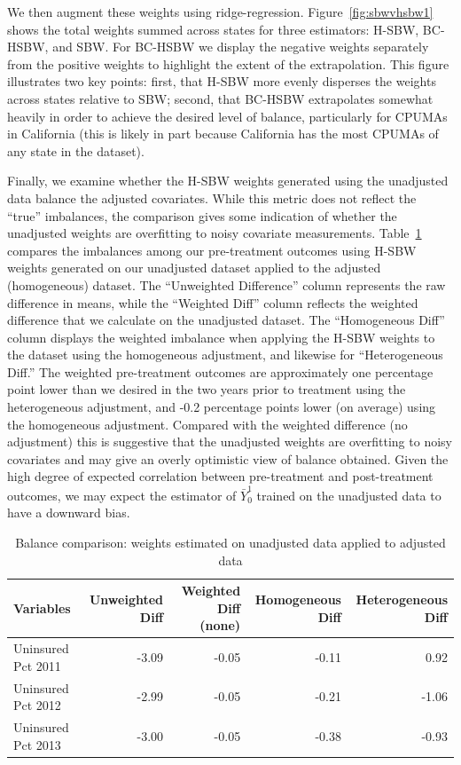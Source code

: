 \documentclass[aoas]{imsart}
\theoremstyle{plain}
\theoremstyle{remark}
\begin{document}
We then augment these weights using ridge-regression. Figure~\ref{fig:sbwvhsbw1} shows the total weights summed across states for three estimators: H-SBW, BC-HSBW, and SBW. For BC-HSBW we display the negative weights separately from the positive weights to highlight the extent of the extrapolation. This figure illustrates two key points: first, that H-SBW more evenly disperses the weights across states relative to SBW; second, that BC-HSBW extrapolates somewhat heavily in order to achieve the desired level of balance, particularly for CPUMAs in California (this is likely in part because California has the most CPUMAs of any state in the dataset).

Finally, we examine whether the H-SBW weights generated using the unadjusted data balance the adjusted covariates. While this metric does not reflect the ``true'' imbalances, the comparison gives some indication of whether the unadjusted weights are overfitting to noisy covariate measurements. Table~\ref{tab:balcomp} compares the imbalances among our pre-treatment outcomes using H-SBW weights generated on our unadjusted dataset applied to the adjusted (homogeneous) dataset. The ``Unweighted Difference'' column represents the raw difference in means, while the ``Weighted Diff'' column reflects the weighted difference that we calculate on the unadjusted dataset. The ``Homogeneous Diff'' column displays the weighted imbalance when applying the H-SBW weights to the dataset using the homogeneous adjustment, and likewise for ``Heterogeneous Diff.'' The weighted pre-treatment outcomes are approximately one percentage point lower than we desired in the two years prior to treatment using the heterogeneous adjustment, and -0.2 percentage points lower (on average) using the homogeneous adjustment. Compared with the weighted difference (no adjustment) this is suggestive that the unadjusted weights are overfitting to noisy covariates and may give an overly optimistic view of balance obtained. Given the high degree of expected correlation between pre-treatment and post-treatment outcomes, we may expect the estimator of $\bar{Y}^1_0$ trained on the unadjusted data to have a downward bias.

\begin{table}[ht]
\caption{Balance comparison: weights estimated on unadjusted data applied to adjusted data}\label{tab:balcomp}
\begin{tabular}{lrrrr}
  \hline
Variables & Unweighted Diff & Weighted Diff (none) & Homogeneous Diff & Heterogeneous Diff\\ 
  \hline
Uninsured Pct 2011 & -3.09 & -0.05 & -0.11 & 0.92 \\ 
  Uninsured Pct 2012 & -2.99 & -0.05 & -0.21 & -1.06 \\ 
  Uninsured Pct 2013 & -3.00 & -0.05 & -0.38 & -0.93 \\
   \hline
\end{tabular}
\end{table}
\end{document}
